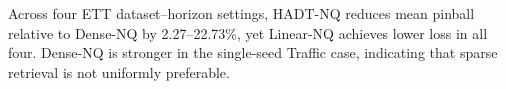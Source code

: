 Across four ETT dataset--horizon settings, HADT-NQ reduces mean pinball relative to Dense-NQ by 2.27--22.73\%, yet Linear-NQ achieves lower loss in all four. Dense-NQ is stronger in the single-seed Traffic case, indicating that sparse retrieval is not uniformly preferable.
